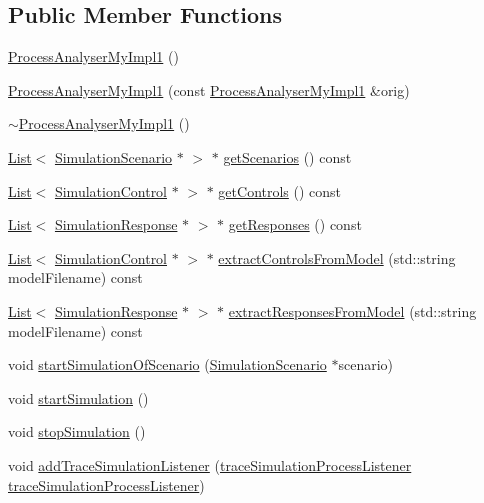 \subsection*{Public Member Functions}
\begin{DoxyCompactItemize}
\item 
\hyperlink{class_process_analyser_my_impl1_ac71ae1beb3b827d4fad5429cc394e6e5}{Process\-Analyser\-My\-Impl1} ()
\item 
\hyperlink{class_process_analyser_my_impl1_a040744994793866b4843e66a726a6db0}{Process\-Analyser\-My\-Impl1} (const \hyperlink{class_process_analyser_my_impl1}{Process\-Analyser\-My\-Impl1} \&orig)
\item 
\hyperlink{class_process_analyser_my_impl1_a42185ce89f4c324e0f6adf3cb4b10aa4}{$\sim$\-Process\-Analyser\-My\-Impl1} ()
\item 
\hyperlink{class_list}{List}$<$ \hyperlink{class_simulation_scenario}{Simulation\-Scenario} $\ast$ $>$ $\ast$ \hyperlink{class_process_analyser_my_impl1_a17c3b2c84926e051d8152f257480debd}{get\-Scenarios} () const 
\item 
\hyperlink{class_list}{List}$<$ \hyperlink{class_simulation_control}{Simulation\-Control} $\ast$ $>$ $\ast$ \hyperlink{class_process_analyser_my_impl1_aece4a70c290157902dce0be02dd229ea}{get\-Controls} () const 
\item 
\hyperlink{class_list}{List}$<$ \hyperlink{class_simulation_response}{Simulation\-Response} $\ast$ $>$ $\ast$ \hyperlink{class_process_analyser_my_impl1_a5ceddb133d3740afb7a7e0aeafec0b47}{get\-Responses} () const 
\item 
\hyperlink{class_list}{List}$<$ \hyperlink{class_simulation_control}{Simulation\-Control} $\ast$ $>$ $\ast$ \hyperlink{class_process_analyser_my_impl1_a21cca0a0cc9831aa674f783968534a4c}{extract\-Controls\-From\-Model} (std\-::string model\-Filename) const 
\item 
\hyperlink{class_list}{List}$<$ \hyperlink{class_simulation_response}{Simulation\-Response} $\ast$ $>$ $\ast$ \hyperlink{class_process_analyser_my_impl1_adf4f53b5a01d17ca04159dae6f6e2c88}{extract\-Responses\-From\-Model} (std\-::string model\-Filename) const 
\item 
void \hyperlink{class_process_analyser_my_impl1_a597543c7676c46c7c47046205d3903f3}{start\-Simulation\-Of\-Scenario} (\hyperlink{class_simulation_scenario}{Simulation\-Scenario} $\ast$scenario)
\item 
void \hyperlink{class_process_analyser_my_impl1_a3b3092c3814aa31efc2c544d821812a2}{start\-Simulation} ()
\item 
void \hyperlink{class_process_analyser_my_impl1_a4db69ac95212f475cf014d68d1154a47}{stop\-Simulation} ()
\item 
void \hyperlink{class_process_analyser_my_impl1_a6089c0772184c64d9fec52e9a46dd0ee}{add\-Trace\-Simulation\-Listener} (\hyperlink{_trace_manager_8h_a8f5a30615774c5ee0b5c5f86741e4b6f}{trace\-Simulation\-Process\-Listener} \hyperlink{_trace_manager_8h_a8f5a30615774c5ee0b5c5f86741e4b6f}{trace\-Simulation\-Process\-Listener})
\end{DoxyCompactItemize}


